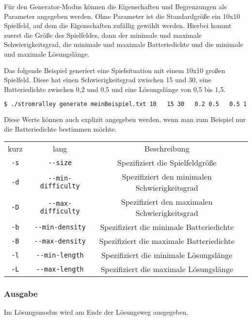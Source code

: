 \documentclass[a4paper,10pt,ngerman]{scrartcl}
\begin{document}
Für den Generator-Modus können die Eigenschaften und Begrenzungen als Parameter angegeben werden.
Ohne Parameter ist die Standardgröße ein 10x10 Spielfeld, auf dem die Eigenschaften zufällig gewählt werden.
Hierbei kommt zuerst die Größe des Spielfeldes, dann der minimale und maximale Schwierigkeitsgrad,
die minimale und maximale Batteriedichte und die minimale und maximale Lösungslänge.

Das folgende Beispiel generiert eine Spielsituation mit einem 10x10 großen Spielfeld.
Diese hat einen Schwierigkeitsgrad zwischen 15 und 30, eine Batteriedichte zwischen 0,2 und 0,5 und eine Lösungslänge von 0,5 bis 1,5.

\begin{lstlisting}[language=bash, numbers=none, frame=single]
$ ./stromralley generate meinBeispiel.txt 10   15 30   0.2 0.5   0.5 1.5
\end{lstlisting}

Diese Werte können auch explizit angegeben werden, wenn man zum Beispiel nur die Batteriedichte bestimmen möchte.

\begin{table}[ht]
  \centering
  \begin{tabular}{c|c|c|l}
    kurz & lang & Beschreibung \\
    \texttt{-s} & \texttt{-{}-size} & Spezifiziert die Spielfeldgröße \\

    \texttt{-d} & \texttt{-{}-min-difficulty} & Spezifiziert den minimalen Schwierigkeitsgrad \\
    \texttt{-D} & \texttt{-{}-max-difficulty} & Spezifiziert den maximalen Schwierigkeitsgrad \\

    \texttt{-b} & \texttt{-{}-min-density} & Spezifiziert die minimale Batteriedichte \\
    \texttt{-B} & \texttt{-{}-max-density} & Spezifiziert die maximale Batteriedichte \\

    \texttt{-l} & \texttt{-{}-min-length} & Spezifiziert die minimale Lösungslänge \\
    \texttt{-L} & \texttt{-{}-max-length} & Spezifiziert die maximale Lösungslänge \\
  \end{tabular}
\end{table}

\subsubsection{Ausgabe}
Im Lösungsmodus wird am Ende der Lösungsweg ausgegeben.
\end{document}
